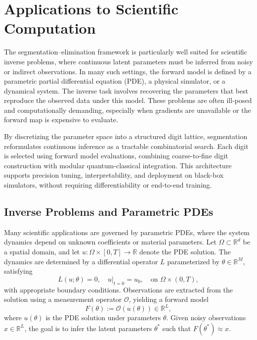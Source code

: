 \documentclass[aps,twocolumn,superscriptaddress,nofootinbib]{revtex4}
\begin{document}
\section{Applications to Scientific Computation}
\label{sec:applications}
The segmentation--elimination framework is particularly well suited for scientific inverse problems, where continuous latent parameters must be inferred from noisy or indirect observations. In many such settings, the forward model is defined by a parametric partial differential equation (PDE), a physical simulator, or a dynamical system. The inverse task involves recovering the parameters that best reproduce the observed data under this model. These problems are often ill-posed and computationally demanding, especially when gradients are unavailable or the forward map is expensive to evaluate.

By discretizing the parameter space into a structured digit lattice, segmentation reformulates continuous inference as a tractable combinatorial search. Each digit is selected using forward model evaluations, combining coarse-to-fine digit construction with modular quantum-classical integration. This architecture supports precision tuning, interpretability, and deployment on black-box simulators, without requiring differentiability or end-to-end training.
\subsection{Inverse Problems and Parametric PDEs}
Many scientific applications are governed by parametric PDEs, where the system dynamics depend on unknown coefficients or material parameters. Let $\Omega \subset \mathbb{R}^d$ be a spatial domain, and let $u: \Omega \times [0,T] \to \mathbb{R}$ denote the PDE solution. The dynamics are determined by a differential operator $L$ parameterized by $\theta \in \mathbb{R}^M$, satisfying
\begin{equation}
    L(u; \theta) = 0, \quad u|_{t=0} = u_0, \quad \text{on } \Omega \times (0,T),
\end{equation}
with appropriate boundary conditions. Observations are extracted from the solution using a measurement operator $\mathcal{O}$, yielding a forward model
\begin{equation}
    F(\theta) := \mathcal{O}(u(\theta)) \in \mathbb{R}^L,
\end{equation}
where $u(\theta)$ is the PDE solution under parameters $\theta$. Given noisy observations $x \in \mathbb{R}^L$, the goal is to infer the latent parameters $\theta^*$ such that $F(\theta^*) \approx x$.
\end{document}
